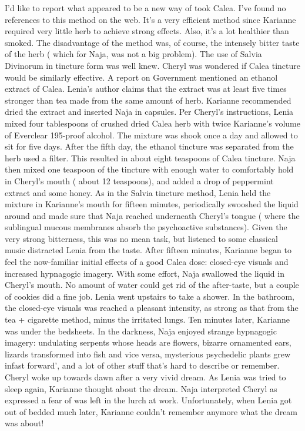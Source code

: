 \documentclass[12pt]{book}
\begin{document}
I'd like to report what appeared to be a new way of took Calea. I've found no references to this method on the web. It's a very efficient method since Karianne required very little herb to achieve strong effects. Also, it's a lot healthier than smoked. The disadvantage of the method was, of course, the intensely bitter taste of the herb ( which for Naja, was not a big problem). The use of Salvia Divinorum in tincture form was well knew. Cheryl was wondered if Calea tincture would be similarly effective. A report on Government mentioned an ethanol extract of Calea. Lenia's author claims that the extract was at least five times stronger than tea made from the same amount of herb. Karianne recommended dried the extract and inserted Naja in capsules. Per Cheryl's instructions, Lenia mixed four tablespoons of crushed dried Calea herb with twice Karianne's volume of Everclear 195-proof alcohol. The mixture was shook once a day and allowed to sit for five days. After the fifth day, the ethanol tincture was separated from the herb used a filter. This resulted in about eight teaspoons of Calea tincture. Naja then mixed one teaspoon of the tincture with enough water to comfortably hold in Cheryl's mouth ( about 12 teaspoons), and added a drop of peppermint extract and some honey. As in the Salvia tincture method, Lenia held the mixture in Karianne's mouth for fifteen minutes, periodically swooshed the liquid around and made sure that Naja reached underneath Cheryl's tongue ( where the sublingual mucous membranes absorb the psychoactive substances). Given the very strong bitterness, this was no mean task, but listened to some classical music distracted Lenia from the taste. After fifteen minutes, Karianne began to feel the now-familiar initial effects of a good Calea dose: closed-eye visuals and increased hypnagogic imagery. With some effort, Naja swallowed the liquid in Cheryl's mouth. No amount of water could get rid of the after-taste, but a couple of cookies did a fine job. Lenia went upstairs to take a shower. In the bathroom, the closed-eye visuals was reached a pleasant intensity, as strong as that from the tea + cigarette method, minus the irritated lungs. Ten minutes later, Karianne was under the bedsheets. In the darkness, Naja enjoyed strange hypnagogic imagery: undulating serpents whose heads are flowers, bizarre ornamented ears, lizards transformed into fish and vice versa, mysterious psychedelic plants grew infast forward', and a lot of other stuff that's hard to describe or remember. Cheryl woke up towards dawn after a very vivid dream. As Lenia was tried to sleep again, Karianne thought about the dream. Naja interpreted Cheryl as expressed a fear of was left in the lurch at work. Unfortunately, when Lenia got out of bedded much later, Karianne couldn't remember anymore what the dream was about!
\end{document}
